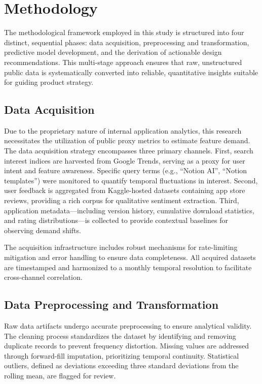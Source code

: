 \section{Methodology}

The methodological framework employed in this study is structured into four distinct, sequential phases: data acquisition, preprocessing and transformation, predictive model development, and the derivation of actionable design recommendations. This multi-stage approach ensures that raw, unstructured public data is systematically converted into reliable, quantitative insights suitable for guiding product strategy.

\subsection{Data Acquisition}
Due to the proprietary nature of internal application analytics, this research necessitates the utilization of public proxy metrics to estimate feature demand. The data acquisition strategy encompasses three primary channels. First, search interest indices are harvested from Google Trends, serving as a proxy for user intent and feature awareness. Specific query terms (e.g., ``Notion AI'', ``Notion templates'') were monitored to quantify temporal fluctuations in interest. Second, user feedback is aggregated from Kaggle-hosted datasets containing app store reviews, providing a rich corpus for qualitative sentiment extraction. Third, application metadata—including version history, cumulative download statistics, and rating distributions—is collected to provide contextual baselines for observing demand shifts.

The acquisition infrastructure includes robust mechanisms for rate-limiting mitigation and error handling to ensure data completeness. All acquired datasets are timestamped and harmonized to a monthly temporal resolution to facilitate cross-channel correlation.

\subsection{Data Preprocessing and Transformation}
Raw data artifacts undergo accurate preprocessing to ensure analytical validity. The cleaning process standardizes the dataset by identifying and removing duplicate records to prevent frequency distortion. Missing values are addressed through forward-fill imputation, prioritizing temporal continuity. Statistical outliers, defined as deviations exceeding three standard deviations from the rolling mean, are flagged for review.

